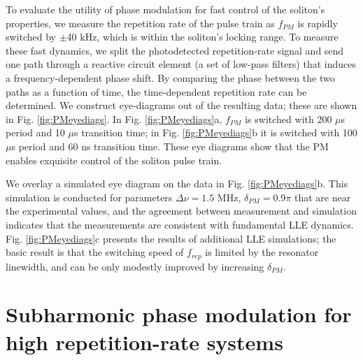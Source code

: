 To evaluate the utility of phase modulation for fast control of the soliton's properties, we measure the repetition rate of the pulse train as $f_{PM}$ is rapidly switched by $\pm$40 kHz, which is within the soliton's locking range.  To measure these fast dynamics, we split the photodetected repetition-rate signal and send one path through a reactive circuit element (a set of low-pass filters) that induces a frequency-dependent phase shift. By comparing the phase between the two paths as a function of time, the time-dependent repetition rate can be determined. We construct eye-diagrams out of the resulting data; these are shown in Fig. \ref{fig:PMeyediags}. In Fig. \ref{fig:PMeyediags}a, $f_{PM}$ is switched with 200 $\mu$s period and 10 $\mu$s transition time; in Fig. \ref{fig:PMeyediags}b it is switched with 100 $\mu$s period and 60 ns transition time. These eye diagrams show that the PM enables exquisite control of the soliton pulse train.

We overlay a simulated eye diagram on the data in Fig. \ref{fig:PMeyediags}b. This simulation is conducted for parameters $\Delta\nu=1.5$ MHz, $\delta_{PM}=0.9\pi$ that are near the experimental values, and the agreement between measurement and simulation indicates that the measurements are consistent with fundamental LLE dynamics. Fig. \ref{fig:PMeyediags}c presents the results of additional LLE simulations; the basic result is that the switching speed of $f_{rep}$ is limited by the resonator linewidth, and can be only modestly improved by increasing $\delta_{PM}$. 



\section{Subharmonic phase modulation for high repetition-rate systems}

